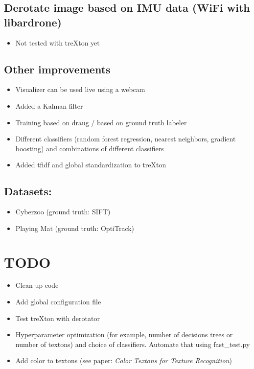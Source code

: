 \documentclass[11pt]{article}
\begin{document}
\subsection{Derotate image based on IMU data (WiFi with libardrone)}
\label{sec-2-4}
\begin{itemize}
\item Not tested with treXton yet
\end{itemize}

\subsection{Other improvements}
\label{sec-2-5}
\begin{itemize}
\item Visualizer can be used live using a webcam
\item Added a Kalman filter
\item Training based on draug / based on ground truth labeler
\item Different classifiers (random forest regression, nearest neighbors,
gradient boosting) and combinations of different classifiers
\item Added tfidf and global standardization to treXton
\end{itemize}


\subsection{Datasets:}
\label{sec-2-6}
\begin{itemize}
\item Cyberzoo (ground truth: SIFT)
\item Playing Mat (ground truth: OptiTrack)
\end{itemize}

\section{{\bfseries\sffamily TODO} }
\label{sec-3}
\begin{itemize}
\item Clean up code
\item Add global configuration file
\item Test treXton with derotator
\item Hyperparameter optimization (for example, number of decisions trees
or number of textons) and choice of classifiers. Automate that using fast\_test.py
\item Add color to textons (see paper: \emph{Color Textons for Texture
Recognition})
\end{itemize}
\end{document}
